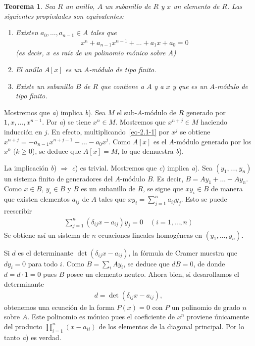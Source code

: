 \documentclass[bibtotoc,leqno,spanish]{amsbook}
\newcommand{\then}{\ensuremath{\Rightarrow}\xspace}
\numberwithin{equation}{section}
\theoremstyle{note}
\theoremstyle{note}
\newtheorem{theorem}{Teorema}
\theoremstyle{rem}
\numberwithin{theorem}{section}
\numberwithin{proposition}{section}
\numberwithin{definition}{section}
\numberwithin{lemma}{section}
\numberwithin{corollary}{section}
\numberwithin{example}{section}
\numberwithin{footnote}{section}%
\begin{document}
\begin{theorem}\label{teo2.1.1}
Sea $R$ un anillo, $A$ un subanillo de $R$ y $x$ un elemento de $R$. Las siguientes propiedades son equivalentes:
\begin{enumerate}
\item Existen $a_{0},\dots,a_{n-1}\in A$ tales que
\begin{gather}\label{eq-2.1-1}
x^{n}+a_{n-1}x^{n-1}+\dots+a_{1}x+a_{0} = 0
\end{gather}
(es decir, $x$ es ra\'iz de un polinomio m\'onico sobre $A$)
\item El anillo $A[x]$ es un $A$-m\'odulo de tipo finito.
\item Existe un subanillo $B$ de $R$ que contiene a $A$ y a $x$ y que es un $A$-m\'odulo
de tipo finito.
\end{enumerate}
\end{theorem}

Mostremos que {\itshape a}) implica {\itshape b}). Sea $M$ el sub-$A$-m\'odulo de $R$ generado por $1, x, \dots, x^{n-1}$.
Por {\itshape a}) se tiene $x^{n}\in M$. Mostremos que $x^{n+j}\in M$ haciendo inducci\'on en $j$. En efecto,
multiplicando~\eqref{eq-2.1-1} por $x^{j}$ se obtiene $x^{n+j}=-a_{n-1}x^{n+j-1}-\dots-a_{0}x^{j}$.
Como $A[x]$ es el $A$-m\'odulo generado por los $x^{k}$ ($k\geq 0$), se deduce que $A[x] = M$, lo que demuestra
{\itshape b}).

La implicaci\'on {\itshape b}) $\then$ {\itshape c}) es trivial. Mostremos que {\itshape c}) implica {\itshape a}).
Sea $(y_{1},\dots,y_{n})$ un sistema finito de generadores del $A$-m\'odulo $B$. Es decir,
$B = Ay_{1}+\dots+Ay_{n}$. Como $x\in B$, $y_{i}\in B$
y $B$ es un subanillo de $R$, se sigue que $xy_{i}\in B$ de manera que existen elementos $a_{ij}$ de $A$
tales que $xy_{i} = \sum_{j=1}^{n}a_{ij}y_{j}$. Esto se puede reescribir
\begin{gather*}
\sum_{j=1}^{n}(\delta_{ij}x-a_{ij})y_{j} = 0\quad(i=1,\dots,n)
\end{gather*}
Se obtiene as\'i un sistema de $n$ ecuaciones lineales homog\'eneas en $(y_{1},\dots,y_{n})$.

Si $d$ es el determinante $\det(\delta_{ij}x-a_{ij})$, la f\'ormula de
Cramer muestra que $dy_{i} = 0$ para todo $i$. Como $B = \sum_{i}Ay_{i}$, se deduce que
$dB = 0$, de donde $d = d\cdot 1 = 0$ pues $B$ posee un elemento neutro. Ahora bien, si desarollamos el
determinante
\begin{gather*}
d = \det(\delta_{ij}x - a_{ij}),
\end{gather*}
obtenemos una ecuaci\'on de la forma $P(x) = 0$ con $P$ un polinomio de grado $n$ sobre $A$. Este polinomio
es m\'onico pues el coeficiente de $x^{n}$ proviene \'unicamente del producto $\prod_{i=1}^{n}(x-a_{ii})$
de los elementos de la diagonal principal. Por lo tanto {\itshape a}) es verdad.
\end{document}
